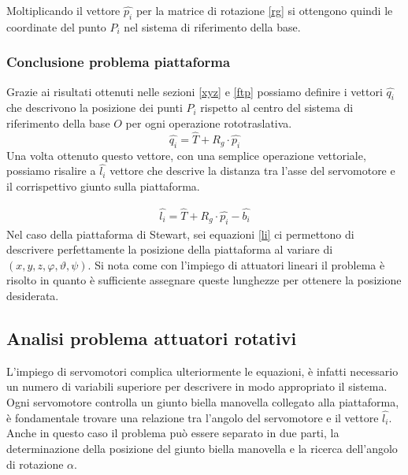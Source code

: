 \documentclass[11pt]{article}
\begin{document}
Moltiplicando il vettore $\hat{p_i}$ per la matrice di rotazione \eqref{rg} si ottengono quindi le coordinate del punto $P_i$ nel sistema di riferimento della base. 

\subsubsection{Conclusione problema piattaforma}
Grazie ai risultati ottenuti nelle sezioni \ref{xyz} e \ref{ftp} possiamo definire i vettori $\hat{q_i}$ che descrivono la posizione dei punti $P_i$ rispetto al centro del sistema di riferimento della base $O$ per ogni operazione rototraslativa.
\begin{equation}\label{qi}
\hat{q_i}=\hat{T}+R_g\cdot \hat{p_i}
\end{equation}
Una volta ottenuto questo vettore, con una semplice operazione vettoriale, possiamo risalire a $\hat{l_i}$ vettore che descrive la distanza tra l'asse del servomotore e il corrispettivo giunto sulla piattaforma.

\begin{align}\label{li}
\hat{l_i}=\hat{T}+R_g\cdot \hat{p_i}-\hat{b_i}
\end{align}
Nel caso della piattaforma di Stewart, sei equazioni \eqref{li} ci permettono di descrivere perfettamente la posizione della piattaforma al variare di $(x,y,z,\varphi,\vartheta,\psi)$.
Si nota come con l'impiego di attuatori lineari il problema è risolto in quanto è sufficiente assegnare queste lunghezze per ottenere la posizione desiderata. 
\subsection{Analisi problema attuatori rotativi}
L'impiego di servomotori complica ulteriormente le equazioni, è infatti necessario un numero di variabili superiore per descrivere in modo appropriato il sistema. Ogni servomotore controlla un giunto biella manovella collegato alla piattaforma, è fondamentale trovare una relazione tra l'angolo del servomotore e il vettore $\hat{l_i}$. Anche in questo caso il problema può essere separato in due parti, la determinazione della posizione del giunto biella manovella e la ricerca dell'angolo di rotazione $\alpha$.
\end{document}
